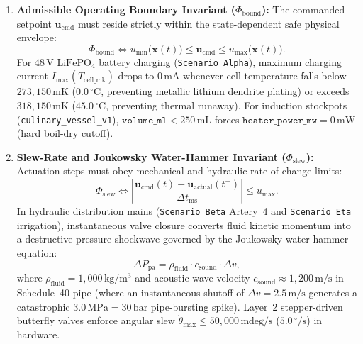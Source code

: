 \begin{enumerate}
    \item \textbf{Admissible Operating Boundary Invariant ($\Phi_{\mathrm{bound}}$):} The commanded setpoint $\mathbf{u}_{\mathrm{cmd}}$ must reside strictly within the state-dependent safe physical envelope:
    \begin{equation}
        \Phi_{\mathrm{bound}} \iff u_{\min}\bigl(\mathbf{x}(t)\bigr) \le \mathbf{u}_{\mathrm{cmd}} \le u_{\max}\bigl(\mathbf{x}(t)\bigr).
        \label{eq:l2-phi-bound}
    \end{equation}
    For $48\,\mathrm{V}$ $\mathrm{LiFePO_4}$ battery charging (\texttt{Scenario Alpha}), maximum charging current $I_{\max}(T_{\mathrm{cell\_mk}})$ drops to $0\,\mathrm{mA}$ whenever cell temperature falls below $273{,}150\,\mathrm{mK}$ ($0.0\,^\circ\mathrm{C}$, preventing metallic lithium dendrite plating) or exceeds $318{,}150\,\mathrm{mK}$ ($45.0\,^\circ\mathrm{C}$, preventing thermal runaway). For induction stockpots (\texttt{culinary\_vessel\_v1}), $\mathtt{volume\_ml} < 250\,\mathrm{mL}$ forces $\mathtt{heater\_power\_mw} = 0\,\mathrm{mW}$ (hard boil-dry cutoff).
    \item \textbf{Slew-Rate and Joukowsky Water-Hammer Invariant ($\Phi_{\mathrm{slew}}$):} Actuation steps must obey mechanical and hydraulic rate-of-change limits:
    \begin{equation}
        \Phi_{\mathrm{slew}} \iff \left| \frac{\mathbf{u}_{\mathrm{cmd}}(t) - \mathbf{u}_{\mathrm{actual}}(t^-)}{\Delta t_{\mathrm{ms}}} \right| \le \dot{u}_{\max}.
        \label{eq:l2-phi-slew}
    \end{equation}
    In hydraulic distribution mains (\texttt{Scenario Beta} Artery~4 and \texttt{Scenario Eta} irrigation), instantaneous valve closure converts fluid kinetic momentum into a destructive pressure shockwave governed by the Joukowsky water-hammer equation:
    \begin{equation}
        \Delta P_{\mathrm{pa}} = \rho_{\mathrm{fluid}} \cdot c_{\mathrm{sound}} \cdot \Delta v,
        \label{eq:l2-joukowsky-hammer}
    \end{equation}
    where $\rho_{\mathrm{fluid}} = 1{,}000\,\mathrm{kg/m^3}$ and acoustic wave velocity $c_{\mathrm{sound}} \approx 1{,}200\,\mathrm{m/s}$ in Schedule~40 pipe (where an instantaneous shutoff of $\Delta v = 2.5\,\mathrm{m/s}$ generates a catastrophic $3.0\,\mathrm{MPa} = 30\,\mathrm{bar}$ pipe-bursting spike). Layer~2 stepper-driven butterfly valves enforce angular slew $\dot{\theta}_{\max} \le 50{,}000\,\mathrm{mdeg/s}$ ($5.0\,^\circ/\mathrm{s}$) in hardware.

\end{enumerate}
